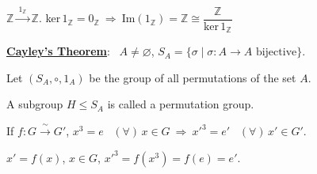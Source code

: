 \documentclass[12pt]{article}
\begin{document}
\bigskip
\noindent $\mathbb{Z} \xrightarrow{\ 1_{\mathbb{Z}}\ } \mathbb{Z}$. \quad ker$\,1_\mathbb{Z} = 0_\mathbb{Z} \ \Rightarrow \ \text{Im}(1_\mathbb{Z}) = \mathbb{Z} \cong \dfrac{\mathbb{Z}}{\text{ker}\,1_\mathbb{Z}}$

\bigskip
\noindent\underline{\textbf{Cayley's Theorem}}: \ $A\neq\varnothing$, $S_A = \{\sigma \mid \sigma:A\to A \text{ bijective}\}$.

\bigskip
\noindent Let $(S_A,\circ,1_A)$ be the group of all permutations of the set $A$.

\noindent A subgroup $H\leq S_A$ is called a permutation group.

\bigskip
\noindent If $f:G\xrightarrow{\ \sim\ }G'$, \quad $x^3=e$ \ $(\forall)\,x\in G \ \Rightarrow \ x'^3=e'$ \ $(\forall)\,x'\in G'$.

\noindent $x'=f(x)$, $x\in G$, \quad $x'^3 = f(x^3) = f(e) = e'$.
\end{document}
